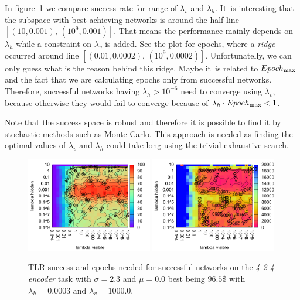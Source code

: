 In figure~\ref{fig:results-tlr-auto4-performance} we compare success rate for range of $\lambda_v$ and $\lambda_h$. It~is interesting that the subspace with best achieving networks is around the half line $[(10, 0.001),\,(10^9, 0.001)]$. That means the performance mainly depends on $\lambda_h$ while a constraint on $\lambda_v$ is added. See the plot for epochs, where a \emph{ridge} occurred around line $[(0.01, 0.0002),\,(10^9, 0.0002)]$. Unfortunatelly, we can only guess what is the reason behind this ridge. Maybe it~is related to $Epoch_{\rm max}$ and the fact that we are calculating epochs only from successful networks. Therefore, successful networks having $\lambda_h > 10^{-6}$ need to converge using $\lambda_v$, because otherwise they would fail to converge because of $\lambda_h \cdot Epoch_{\rm max} < 1$. 

Note that the success space is robust and therefore it is possible to find it by stochastic methods such as Monte Carlo. This approach is needed as finding the optimal values of $\lambda_v$ and $\lambda_h$ could take long using the trivial exhaustive search. 

\begin{figure}[H]
  \centering
  \includegraphics[width=0.49\textwidth]{img/tlr-auto4-success.pdf}   
  \includegraphics[width=0.49\textwidth]{img/tlr-auto4-epoch.pdf}     
  \caption{TLR success and epochs needed for successful networks on the \emph{4-2-4 encoder} task with $\sigma = 2.3$ and $\mu = 0.0$ best being $96.5\$$ with $\lambda_h=0.0003$ and $\lambda_v=1000.0$.}
  \label{fig:results-tlr-auto4-performance}
\end{figure}

